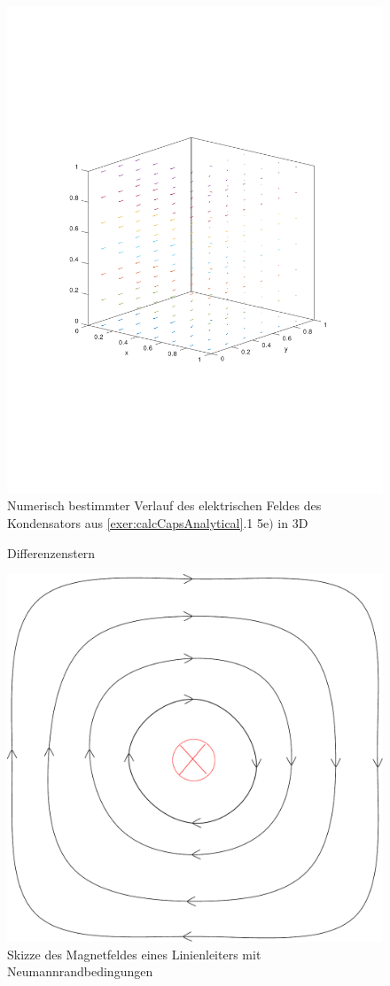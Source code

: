 \documentclass[Protokollheft.tex]{subfiles}
\begin{document}
\begin{figure}[h!]
	\centering
	\includegraphics[trim = 20mm 70mm 20mm 70mm, clip,width=0.7\linewidth]{E_3D_E.pdf}
	\caption{Numerisch bestimmter Verlauf des elektrischen Feldes des Kondensators aus \ref{exer:calcCapsAnalytical}.1 5e$)$ in 3D}
	\label{fig:C_5e_3D}
\end{figure}

\begin{figure}[ht]
	\centering
	\def\svgwidth{0.7\textwidth}
	
	\caption{Differenzenstern}
	\label{fig:diffstern}
\end{figure}
\begin{figure}
	\centering
	\includegraphics[width=0.5\linewidth]{versuch4/NeumannRand}
	\caption{Skizze des Magnetfeldes eines Linienleiters mit Neumannrandbedingungen}
	\label{fig:neumannrand}
\end{figure}
\end{document}
